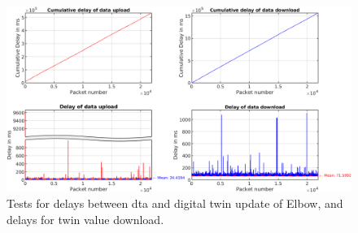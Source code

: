 \begin{figure}[htb]
    \includegraphics[width=\textwidth]{figures/appendix/DT/Delay_UploadDownload_Elbow.png}
    \centering
    \caption{Tests for delays between \gls{dta} and digital twin update of Elbow, 
    and delays for twin value download. \label{fig: UD-sep-Elbow}}
\end{figure}




%

